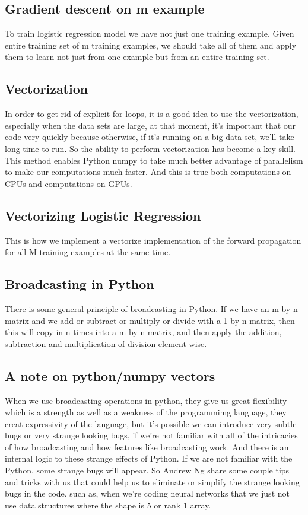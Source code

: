 \documentclass[a4paper]{article}
\begin{document}
\subsection{Gradient descent on m example}
\par To train logistic regression model we have not just one training example. Given entire training set of m training examples, we should take all of them and apply them to learn not just from one example but from an entire training set.
\subsection{Vectorization}
\par In order to get rid of explicit for-loops, it is a good idea to use the vectorization, especially when the data sets are large, at that moment, it's important that our code very quickly because otherwise, if it's running on a big data set, we'll take long time to run. So the ability to perform vectorization has become a key skill. This method enables Python numpy to take much better advantage of parallelism to make our computations much faster. And this is true both computations on CPUs and computations on GPUs.
\subsection{Vectorizing Logistic Regression}
\par This is how we implement a vectorize implementation of the forward propagation for all M training examples at the same time.
\subsection{Broadcasting in Python}
\par There is some general principle of broadcasting in Python. If we have an m by n matrix and we add or subtract or multiply or divide with a 1 by n matrix, then this will copy in n times into a m by n matrix, and then apply the addition, subtraction and multiplication of division element wise.
\subsection{A note on python/numpy vectors}
\par When we use broadcasting operations in python, they give us great flexibility which is a strength as well as a weakness of the programmimg language, they creat expressivity of the language, but it's possible we can introduce very subtle bugs or very strange looking bugs, if we're not familiar with all of the intricacies of how broadcasting and how features like broadcasting work. And there is an internal logic to these strange effects of Python. If we are not familiar with the Python, some strange bugs will appear. So Andrew Ng share some couple tips and tricks with us that could help us to eliminate or simplify the strange looking bugs in the code. such as, when we're coding neural networks that we just not use data structures where the shape is 5 or rank 1 array.
\end{document}
